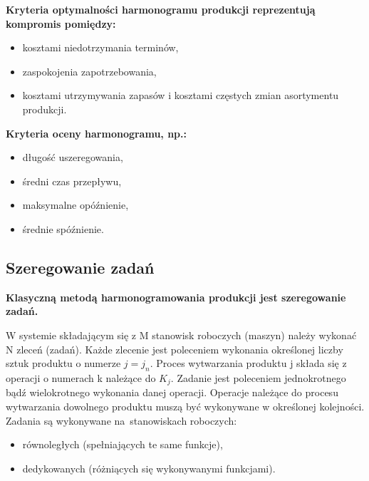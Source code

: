 \documentclass[10pt, a
4paper]{article}
\begin{document}
\noindent \textbf{Kryteria optymalności harmonogramu produkcji reprezentują kompromis pomiędzy:}
\begin{itemize}
\item kosztami niedotrzymania terminów,
\item zaspokojenia zapotrzebowania,
\item kosztami utrzymywania zapasów i kosztami częstych zmian asortymentu produkcji.
\end{itemize}
\noindent \textbf{Kryteria oceny harmonogramu, np.:}
\begin{itemize}
\item długość uszeregowania,
\item średni czas przepływu,
\item maksymalne opóźnienie,
\item średnie spóźnienie.
\end{itemize}

\subsection{Szeregowanie zadań}
\noindent \textbf{Klasyczną metodą harmonogramowania produkcji jest szeregowanie zadań.}

W systemie składającym się z M stanowisk roboczych (maszyn) należy wykonać N zleceń (zadań). Każde zlecenie jest poleceniem wykonania określonej liczby sztuk produktu o numerze $j=j_{n}$.
Proces wytwarzania produktu j składa się z operacji o numerach k należące do $K_{j}$. Zadanie jest poleceniem jednokrotnego bądź wielokrotnego wykonania danej operacji. Operacje należące do procesu wytwarzania dowolnego produktu muszą być wykonywane w określonej kolejności. Zadania są wykonywane na~stanowiskach roboczych:
\begin{itemize}
\item równoległych (spełniających te same funkcje),
\item dedykowanych (różniących się wykonywanymi funkcjami).
\end{itemize}
\end{document}
